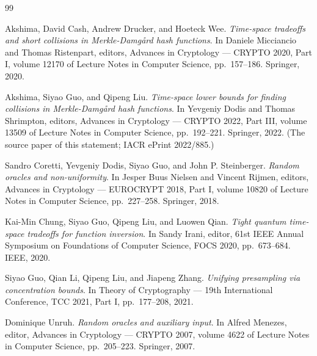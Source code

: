 \documentclass{aicr-conjecture}
\begin{document}
\begin{aicrbibliography}{99}

Akshima, David Cash, Andrew Drucker, and Hoeteck Wee.
\emph{Time-space tradeoffs and short collisions in Merkle-Damg\aa{}rd
hash functions}.
In Daniele Micciancio and Thomas Ristenpart, editors, Advances in
Cryptology --- CRYPTO 2020, Part I, volume 12170 of Lecture Notes in
Computer Science, pp.\ 157--186. Springer, 2020.

Akshima, Siyao Guo, and Qipeng Liu.
\emph{Time-space lower bounds for finding collisions in
Merkle-Damg\aa{}rd hash functions}.
In Yevgeniy Dodis and Thomas Shrimpton, editors, Advances in Cryptology
--- CRYPTO 2022, Part III, volume 13509 of Lecture Notes in Computer
Science, pp.\ 192--221. Springer, 2022. (The source paper of this
statement; IACR ePrint 2022/885.)

Sandro Coretti, Yevgeniy Dodis, Siyao Guo, and John P. Steinberger.
\emph{Random oracles and non-uniformity}.
In Jesper Buus Nielsen and Vincent Rijmen, editors, Advances in
Cryptology --- EUROCRYPT 2018, Part I, volume 10820 of Lecture Notes in
Computer Science, pp.\ 227--258. Springer, 2018.

Kai-Min Chung, Siyao Guo, Qipeng Liu, and Luowen Qian.
\emph{Tight quantum time-space tradeoffs for function inversion}.
In Sandy Irani, editor, 61st IEEE Annual Symposium on Foundations of
Computer Science, FOCS 2020, pp.\ 673--684. IEEE, 2020.

Siyao Guo, Qian Li, Qipeng Liu, and Jiapeng Zhang.
\emph{Unifying presampling via concentration bounds}.
In Theory of Cryptography --- 19th International Conference, TCC 2021,
Part I, pp.\ 177--208, 2021.

Dominique Unruh.
\emph{Random oracles and auxiliary input}.
In Alfred Menezes, editor, Advances in Cryptology --- CRYPTO 2007,
volume 4622 of Lecture Notes in Computer Science, pp.\ 205--223.
Springer, 2007.

\end{aicrbibliography}
\end{document}
